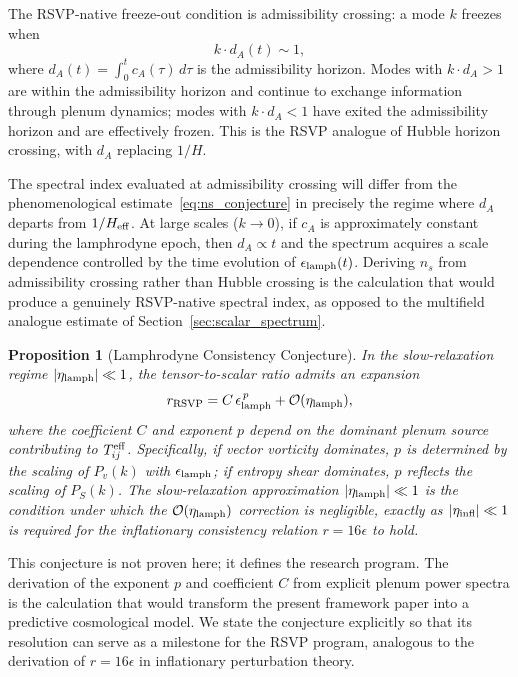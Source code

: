 \documentclass[12pt, a4paper]{article}
\newtheorem{proposition}{Proposition}
\newcommand{\etalamph}{\eta_{\rm lamph}}
\newcommand{\epslamph}{\epsilon_{\rm lamph}}
\newcommand{\Heff}{H_{\rm eff}}
\newcommand{\rRSVP}{r_{\rm RSVP}}
\newcommand{\Teff}{T^{\rm eff}_{ij}}
\begin{document}
The RSVP-native freeze-out condition is admissibility crossing: a mode $k$ freezes
when
\begin{equation}
k \cdot d_A(t) \sim 1,
\label{eq:admissibility_crossing}
\end{equation}
where $d_A(t) = \int_0^t c_A(\tau)\,d\tau$ is the admissibility horizon. Modes
with $k \cdot d_A > 1$ are within the admissibility horizon and continue to
exchange information through plenum dynamics; modes with $k \cdot d_A < 1$ have
exited the admissibility horizon and are effectively frozen. This is the RSVP
analogue of Hubble horizon crossing, with $d_A$ replacing $1/H$.

The spectral index evaluated at admissibility crossing will differ from the
phenomenological estimate~\eqref{eq:ns_conjecture} in precisely the regime where
$d_A$ departs from $1/\Heff$. At large scales ($k \to 0$), if $c_A$ is
approximately constant during the lamphrodyne epoch, then $d_A \propto t$ and the
spectrum acquires a scale dependence controlled by the time evolution of
$\epslamph(t)$. Deriving $n_s$ from admissibility crossing rather than Hubble
crossing is the calculation that would produce a genuinely RSVP-native spectral
index, as opposed to the multifield analogue estimate of
Section~\ref{sec:scalar_spectrum}.

\begin{proposition}[Lamphrodyne Consistency Conjecture]
In the slow-relaxation regime $|\etalamph| \ll 1$, the tensor-to-scalar ratio
admits an expansion
\begin{equation}
\rRSVP = C\,\epslamph^{\,p} + \mathcal{O}(\etalamph),
\label{eq:conjecture}
\end{equation}
where the coefficient $C$ and exponent $p$ depend on the dominant plenum source
contributing to $\Teff$. Specifically, if vector vorticity dominates, $p$ is
determined by the scaling of $P_v(k)$ with $\epslamph$; if entropy shear dominates,
$p$ reflects the scaling of $P_S(k)$. The slow-relaxation approximation
$|\etalamph| \ll 1$ is the condition under which the $\mathcal{O}(\etalamph)$
correction is negligible, exactly as $|\eta_{\rm infl}| \ll 1$ is required for the
inflationary consistency relation $r = 16\epsilon$ to hold.
\end{proposition}

This conjecture is not proven here; it defines the research program. The derivation
of the exponent $p$ and coefficient $C$ from explicit plenum power spectra is the
calculation that would transform the present framework paper into a predictive
cosmological model. We state the conjecture explicitly so that its resolution can
serve as a milestone for the RSVP program, analogous to the derivation of
$r = 16\epsilon$ in inflationary perturbation theory.
\end{document}
